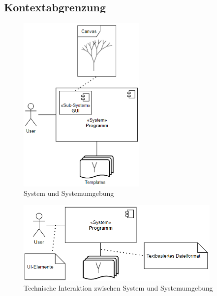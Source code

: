 \subsection{Kontextabgrenzung}
\begin{figure}[H]
    \centering
    \includegraphics[width=6.2cm]{../images/Fachlicher_Kontext.PNG}
    \caption{System und Systemumgebung}
\end{figure}
\begin{figure}[H]
    \centering
    \includegraphics[width=10cm]{../images/Technischer_Kontext.PNG}
    \caption{Technische Interaktion zwischen System und Systemumgebung}
\end{figure}

\newpage

